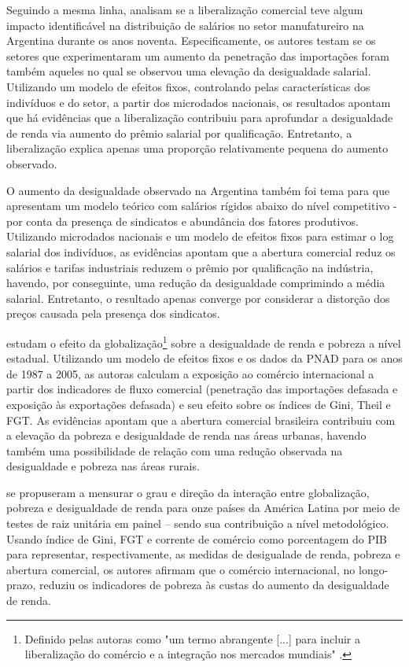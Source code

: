 Seguindo a mesma linha, \textcite{galianisanguinetti03} analisam se a liberalização comercial teve algum impacto identificável na distribuição de salários no setor manufatureiro na Argentina durante os anos noventa. Especificamente, os autores testam se os setores que experimentaram um aumento da penetração das importações foram também aqueles no qual se observou uma elevação da desigualdade salarial. Utilizando um modelo de efeitos fixos, controlando pelas características dos indivíduos e do setor, a partir dos microdados nacionais, os resultados apontam que há evidências que a liberalização contribuiu para aprofundar a desigualdade de renda via aumento do prêmio salarial por qualificação. Entretanto, a liberalização explica apenas uma proporção relativamente pequena do aumento observado.

O aumento da desigualdade observado na Argentina também foi tema para \textcite{galianiporto11} que apresentam um modelo teórico com salários rígidos abaixo do nível competitivo - por conta da presença de sindicatos e abundância dos fatores produtivos. Utilizando microdados nacionais e um modelo de efeitos fixos para estimar o log salarial dos indivíduos, as evidências apontam que a abertura comercial reduz os salários e tarifas industriais reduzem o prêmio por qualificação na indústria, havendo, por conseguinte, uma redução da desigualdade comprimindo a média salarial. Entretanto, o resultado apenas converge por considerar a distorção dos preços causada pela presença dos sindicatos.

\textcite{castilho12} estudam o efeito da globalização\footnote{Definido pelas autoras como "um termo abrangente [...] para incluir a liberalização do comércio e a integração nos mercados mundiais" \cite{castilho12}.} sobre a desigualdade de renda e pobreza a nível estadual. Utilizando um modelo de efeitos fixos e os dados da PNAD para os anos de 1987 a 2005, as autoras calculam a exposição ao comércio internacional a partir dos indicadores de fluxo comercial (penetração das importações defasada e exposição às exportações defasada) e seu efeito sobre os índices de Gini, Theil e FGT. As evidências apontam que a abertura comercial brasileira contribuiu com a elevação da pobreza e desigualdade de renda nas áreas
urbanas, havendo também uma possibilidade de relação com uma redução observada na desigualdade e pobreza nas áreas rurais.

\textcite{bayar17} se propuseram a mensurar o grau e direção da interação entre globalização, pobreza e desigualdade de renda para onze países da América Latina por meio de testes de raiz unitária em painel -- sendo sua contribuição a nível metodológico. Usando índice de Gini, FGT e corrente de comércio como porcentagem do PIB para representar, respectivamente, as medidas de desigualade de renda, pobreza e abertura comercial, os autores afirmam que o comércio internacional, no longo-prazo, reduziu os indicadores de pobreza às custas do aumento da desigualdade de renda.

